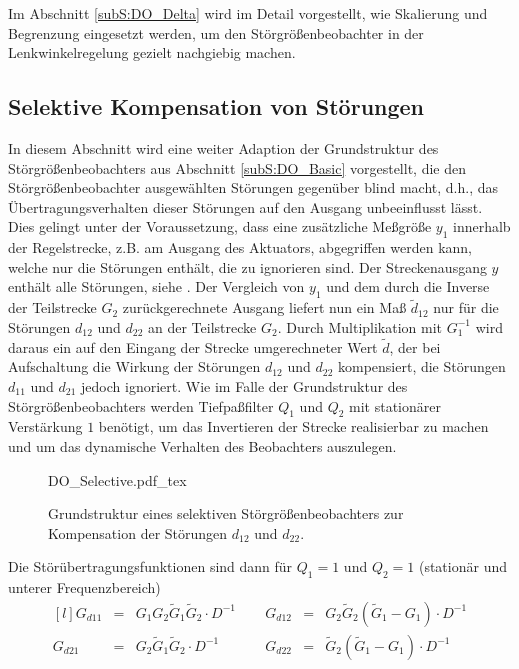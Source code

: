 Im Abschnitt \ref{subS:DO_Delta} wird im Detail vorgestellt, wie Skalierung und Begrenzung eingesetzt werden, um den Störgrößenbeobachter in der Lenkwinkelregelung gezielt nachgiebig  machen.

\subsection{Selektive Kompensation von Störungen}
In diesem Abschnitt wird eine weiter Adaption der Grundstruktur des Störgrößenbeobachters aus Abschnitt \ref{subS:DO_Basic} vorgestellt, die den Störgrößenbeobachter ausgewählten Störungen gegenüber blind macht, d.h., das Übertragungsverhalten dieser Störungen auf den Ausgang unbeeinflusst lässt.
%
Dies gelingt unter der Voraussetzung, dass eine zusätzliche Meßgröße $y_1$ innerhalb der Regelstrecke, z.B. am Ausgang des Aktuators, abgegriffen werden kann, welche nur die Störungen enthält, die zu ignorieren sind. Der Streckenausgang $y$ enthält alle Störungen, siehe .
Der Vergleich von $y_1$ und dem durch die Inverse der Teilstrecke $G_2$ zurückgerechnete Ausgang liefert nun ein Maß $\tilde d_{12}$ nur für die Störungen $d_{12}$ und $d_{22}$ an der Teilstrecke $G_2$. Durch Multiplikation mit $G_1^{-1}$ wird daraus ein auf den Eingang der Strecke umgerechneter Wert $\tilde d$, der bei Aufschaltung die Wirkung der Störungen
$d_{12}$ und $d_{22}$ kompensiert, die Störungen $d_{11}$ und $d_{21}$ jedoch ignoriert.
Wie im Falle der Grundstruktur des Störgrößenbeobachters werden Tiefpaßfilter $Q_1$ und $Q_2$ mit stationärer Verstärkung $1$ benötigt, um das Invertieren der Strecke realisierbar zu machen und um das dynamische Verhalten des Beobachters auszulegen.

\begin{figure}[htp!]
\centering
{DO_Selective.pdf_tex}
\caption{Grundstruktur eines selektiven Störgrößenbeobachters zur Kompensation der Störungen $d_{12}$ und $d_{22}$.}
\label{fig:DO_Modified}
\end{figure}

Die Störübertragungsfunktionen sind dann für $Q_1=1$ und $Q_2=1$ (stationär und unterer Frequenzbereich)
\begin{equation}
\begin{matrix*}[l]
G_{d11}&=&G_1 G_2 \tilde G_1 \tilde G_2 \cdot D^{-1} & \hspace{6pt} &
G_{d12}&=&G_2 \tilde G_2 (\tilde G_1 - G_1) \cdot D^{-1} \\
G_{d21}&=&G_2 \tilde G_1 \tilde G_2 \cdot D^{-1}& \hspace{6pt} &
G_{d22}&=&\tilde G_2 (\tilde G_1 - G_1) \cdot D^{-1}
\end{matrix*}
\label{eq:DoSel01}
\end{equation}

